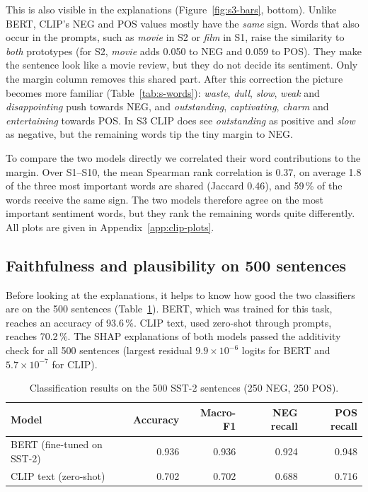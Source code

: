 \documentclass[11pt,a4paper]{article}
\begin{document}
This is also visible in the explanations (Figure~\ref{fig:s3-bars}, bottom). Unlike BERT,
CLIP's NEG and POS values mostly have the \emph{same} sign. Words that also occur in the
prompts, such as \emph{movie} in S2 or \emph{film} in S1, raise the similarity to
\emph{both} prototypes (for S2, \emph{movie} adds 0.050 to NEG and 0.059 to POS). They make
the sentence look like a movie review, but they do not decide its sentiment. Only the
margin column removes this shared part. After this correction the picture becomes more
familiar (Table~\ref{tab:s-words}): \emph{waste}, \emph{dull}, \emph{slow}, \emph{weak} and
\emph{disappointing} push towards NEG, and \emph{outstanding}, \emph{captivating},
\emph{charm} and \emph{entertaining} towards POS. In S3 CLIP does see \emph{outstanding} as
positive and \emph{slow} as negative, but the remaining words tip the tiny margin to NEG.

To compare the two models directly we correlated their word contributions to the margin.
Over S1--S10, the mean Spearman rank correlation is 0.37, on average 1.8 of the three most
important words are shared (Jaccard 0.46), and 59\,\% of the words receive the same sign.
The two models therefore agree on the most important sentiment words, but they rank the
remaining words quite differently. All plots are given in Appendix~\ref{app:clip-plots}.

\subsection{Faithfulness and plausibility on 500 sentences}\label{sec:text-results}

Before looking at the explanations, it helps to know how good the two classifiers are on
the 500 sentences (Table~\ref{tab:classification}). BERT, which was trained for this task,
reaches an accuracy of 93.6\,\%. CLIP text, used zero-shot through prompts, reaches
70.2\,\%. The SHAP explanations of both models passed the additivity check for all 500
sentences (largest residual $9.9\times10^{-6}$ logits for BERT and $5.7\times10^{-7}$ for
CLIP).

\begin{table}[H]
  \centering
  \caption{Classification results on the 500 SST-2 sentences (250 NEG, 250 POS).}
  \label{tab:classification}
  \small
  \begin{tabular}{@{}l r r r r@{}}
    \toprule
    Model & Accuracy & Macro-F1 & NEG recall & POS recall \\
    \midrule
    BERT (fine-tuned on SST-2) & 0.936 & 0.936 & 0.924 & 0.948 \\
    CLIP text (zero-shot)      & 0.702 & 0.702 & 0.688 & 0.716 \\
    \bottomrule
  \end{tabular}
\end{table}
\end{document}
